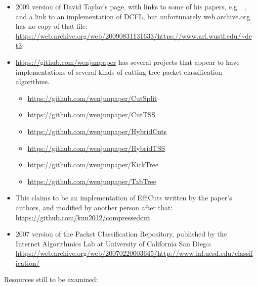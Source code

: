 \documentclass[acmsmall]{acmart}
\begin{document}
\begin{itemize}
\item 2009 version of David Taylor's page, with links to
  some of his papers, e.g. ~\cite{TT2005,TS2005},
  and a link to an implementation of DCFL,
  but unfortunately web.archive.org has no copy of that file: \url{https://web.archive.org/web/20090831131633/https://www.arl.wustl.edu/~det3}
\item \url{https://github.com/wenjunpaper} has several projects that
  appear to have implementations of several kinds of cutting tree
  packet classification algorithms.
  \begin{itemize}
  \item \url{https://github.com/wenjunpaper/CutSplit}
  \item \url{https://github.com/wenjunpaper/CutTSS}
  \item \url{https://github.com/wenjunpaper/HybridCuts}
  \item \url{https://github.com/wenjunpaper/HybridTSS}
  \item \url{https://github.com/wenjunpaper/KickTree}
  \item \url{https://github.com/wenjunpaper/TabTree}
  \end{itemize}
\item This claims to be an implementation of EffiCuts written by the
  paper's authors, and modified by another person after that:
  \url{https://github.com/kun2012/compressedcut}
\item 2007 version of the Packet Classification Repository,
  published by the Internet Algorithmics Lab
  at University of California San Diego:
  \url{https://web.archive.org/web/20070220003645/http://www.ial.ucsd.edu/classification/}
\end{itemize}

Resources still to be examined:
\end{document}

